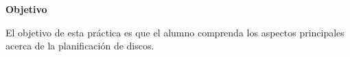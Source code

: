 \documentclass[a4paper,11pt]{exam}
\begin{document}
\maketitle

\textbf{Objetivo}

El objetivo de esta práctica es que el alumno comprenda los aspectos principales acerca de la planificación de discos.


\end{document}
